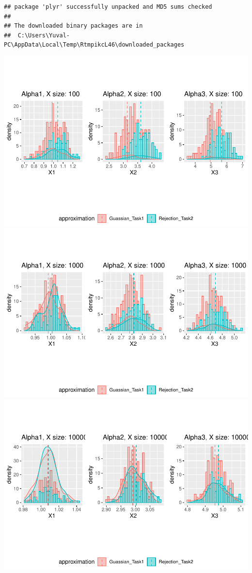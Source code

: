 \documentclass[
]{article}
\begin{document}
\begin{verbatim}
## package 'plyr' successfully unpacked and MD5 sums checked
## 
## The downloaded binary packages are in
##  C:\Users\Yuval-PC\AppData\Local\Temp\RtmpikcL46\downloaded_packages
\end{verbatim}

\includegraphics{take_home_q1_q2_q3_files/figure-latex/unnamed-chunk-3-1.pdf}
\includegraphics{take_home_q1_q2_q3_files/figure-latex/unnamed-chunk-3-2.pdf}
\includegraphics{take_home_q1_q2_q3_files/figure-latex/unnamed-chunk-3-3.pdf}
\end{document}
